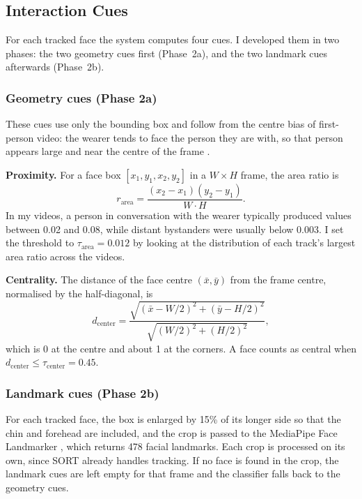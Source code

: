 \subsection{Interaction Cues}
\label{sec:cues}

For each tracked face the system computes four cues. I developed them in two phases: the
two geometry cues first (Phase~2a), and the two landmark cues afterwards (Phase~2b).

\subsubsection{Geometry cues (Phase 2a)}

These cues use only the bounding box and follow from the centre bias of first-person
video: the wearer tends to face the person they are with, so that person appears large and
near the centre of the frame \cite{li2013gaze,fathi2012social}.

\textbf{Proximity.} For a face box $[x_1, y_1, x_2, y_2]$ in a $W \times H$ frame, the
area ratio is
\begin{equation}
  r_{\mathrm{area}} = \frac{(x_2 - x_1)(y_2 - y_1)}{W \cdot H}.
  \label{eq:area_ratio}
\end{equation}
In my videos, a person in conversation with the wearer typically produced values between
0.02 and 0.08, while distant bystanders were usually below 0.003. I set the threshold to
$\tau_{\mathrm{area}} = 0.012$ by looking at the distribution of each track's largest area
ratio across the videos.

\textbf{Centrality.} The distance of the face centre $(\bar{x}, \bar{y})$ from the frame
centre, normalised by the half-diagonal, is
\begin{equation}
  d_{\mathrm{center}} = \frac{\sqrt{(\bar{x} - W/2)^2 + (\bar{y} - H/2)^2}}
                             {\sqrt{(W/2)^2 + (H/2)^2}},
  \label{eq:center_dist}
\end{equation}
which is 0 at the centre and about 1 at the corners. A face counts as central when
$d_{\mathrm{center}} \le \tau_{\mathrm{center}} = 0.45$.

\subsubsection{Landmark cues (Phase 2b)}

For each tracked face, the box is enlarged by 15\% of its longer side so that the chin and
forehead are included, and the crop is passed to the MediaPipe Face Landmarker
\cite{kartynnik2019facemesh}, which returns 478 facial landmarks. Each crop is processed
on its own, since SORT already handles tracking. If no face is found in the crop, the
landmark cues are left empty for that frame and the classifier falls back to the geometry
cues.

